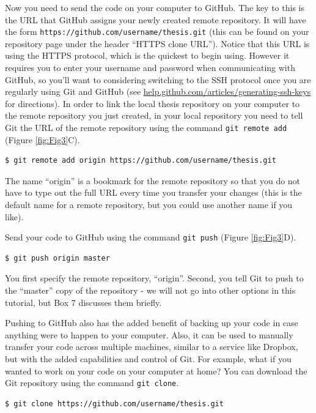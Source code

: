 \documentclass[10pt]{article}
\begin{document}
Now you need to send the code on your computer to GitHub.
The key to this is the URL that GitHub assigns your newly created remote repository.
It will have the form \verb|https://github.com/username/thesis.git| (this can be found on your repository page under the header ``HTTPS clone URL'').
Notice that this URL is using the HTTPS protocol, which is the quickest to begin using.
However it requires you to enter your username and password when communicating with GitHub, so you'll want to considering switching to the SSH protocol once you are regularly using Git and GitHub (see \href{https://help.github.com/articles/generating-ssh-keys/}{help.github.com/articles/generating-ssh-keys} for directions).
In order to link the local thesis repository on your computer to the remote repository you just created, in your local repository you need to tell Git the URL of the remote repository using the command \verb|git remote add| (Figure \ref{fig:Fig3}C).

\begin{verbatim}
$ git remote add origin https://github.com/username/thesis.git
\end{verbatim}

The name ``origin'' is a bookmark for the remote repository so that you do not have to type out the full URL every time you transfer your changes (this is the default name for a remote repository, but you could use another name if you like).

Send your code to GitHub using the command \verb|git push| (Figure \ref{fig:Fig3}D).

\begin{verbatim}
$ git push origin master
\end{verbatim}

You first specify the remote repository, ``origin''.
Second, you tell Git to push to the ``master'' copy of the repository - we will not go into other options in this tutorial, but Box 7 discusses them briefly.

Pushing to GitHub also has the added benefit of backing up your code in case anything were to happen to your computer.
Also, it can be used to manually transfer your code across multiple machines, similar to a service like Dropbox, but with the added capabilities and control of Git.
For example, what if you wanted to work on your code on your computer at home?
You can download the Git repository using the command \verb|git clone|.

\begin{verbatim}
$ git clone https://github.com/username/thesis.git
\end{verbatim}
\end{document}
